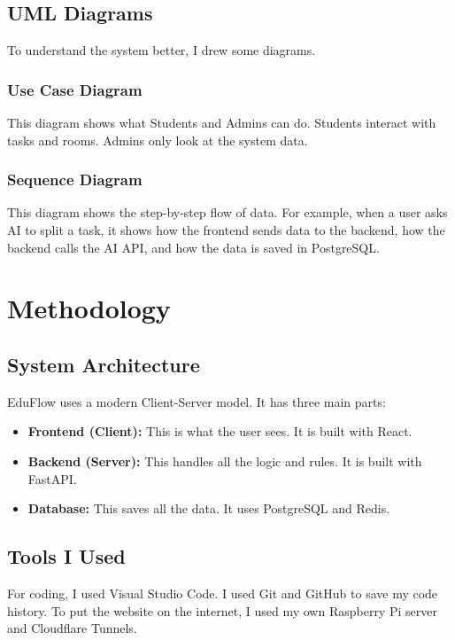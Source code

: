 \documentclass[12pt,a4paper]{report}
\begin{document}
\section{UML Diagrams}
To understand the system better, I drew some diagrams. 

\subsection{Use Case Diagram}
This diagram shows what Students and Admins can do. Students interact with tasks and rooms. Admins only look at the system data.


\subsection{Sequence Diagram}
This diagram shows the step-by-step flow of data. For example, when a user asks AI to split a task, it shows how the frontend sends data to the backend, how the backend calls the AI API, and how the data is saved in PostgreSQL.


\chapter{Methodology}

\section{System Architecture}
EduFlow uses a modern Client-Server model. It has three main parts:
\begin{itemize}
    \item \textbf{Frontend (Client):} This is what the user sees. It is built with React.
    \item \textbf{Backend (Server):} This handles all the logic and rules. It is built with FastAPI.
    \item \textbf{Database:} This saves all the data. It uses PostgreSQL and Redis.
\end{itemize}

\section{Tools I Used}
For coding, I used Visual Studio Code. I used Git and GitHub to save my code history. To put the website on the internet, I used my own Raspberry Pi server and Cloudflare Tunnels.
\end{document}
